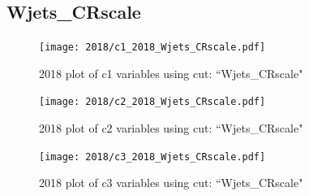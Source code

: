 \documentclass{article}
\begin{document}
      \subsection*{Wjets\_CRscale}
                        \begin{figure}[H]
                            \centering
                            \caption{2018 plot of c1 variables using cut: ``Wjets\_CRscale"}
                            \texttt{[image: 2018/c1\_2018\_Wjets\_CRscale.pdf]}
                        \end{figure}    
                        \begin{figure}[H]
                            \centering
                            \caption{2018 plot of c2 variables using cut: ``Wjets\_CRscale"}
                            \texttt{[image: 2018/c2\_2018\_Wjets\_CRscale.pdf]}
                        \end{figure}    
                        \begin{figure}[H]
                            \centering
                            \caption{2018 plot of c3 variables using cut: ``Wjets\_CRscale"}
                            \texttt{[image: 2018/c3\_2018\_Wjets\_CRscale.pdf]}
                        \end{figure}    
\end{document}
